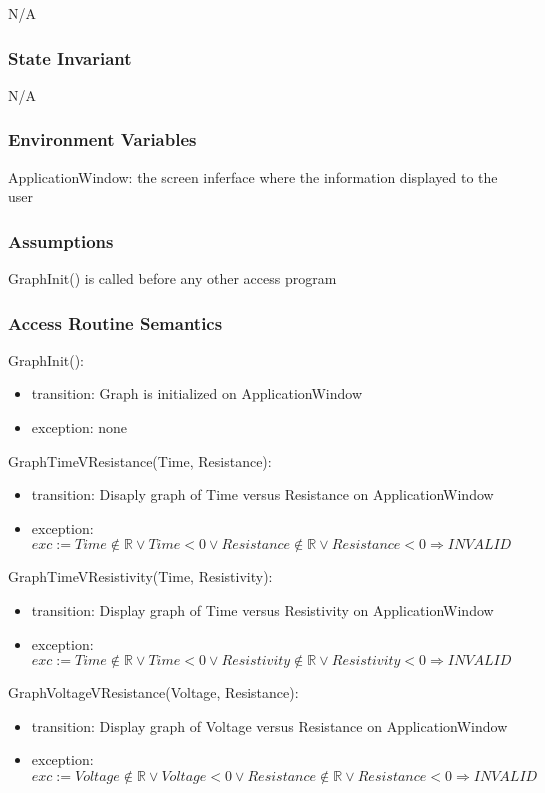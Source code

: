 \documentclass[12pt, titlepage]{article}
\begin{document}
N/A

\subsubsection{State Invariant}

N/A
\subsubsection{Environment Variables}

ApplicationWindow: the screen inferface where the information displayed to the user

\subsubsection{Assumptions}

GraphInit() is called before any other access program

\subsubsection{Access Routine Semantics}

\noindent GraphInit():
\begin{itemize}
\item transition: Graph is initialized on ApplicationWindow
\item exception: none
\end{itemize}

\noindent GraphTimeVResistance(Time, Resistance):
\begin{itemize}
\item transition: Disaply graph of Time versus Resistance on ApplicationWindow 
\item exception: $exc:= Time \notin  \mathbb{R} \lor Time < 0 \lor  Resistance \notin  \mathbb{R} \lor Resistance < 0\Rightarrow INVALID$
\end{itemize}

\noindent GraphTimeVResistivity(Time, Resistivity):
\begin{itemize}
\item transition: Display graph of Time versus Resistivity on ApplicationWindow
\item exception: $exc:= Time \notin  \mathbb{R} \lor Time < 0 \lor  Resistivity \notin  \mathbb{R} \lor Resistivity < 0\Rightarrow INVALID$
\end{itemize}

\noindent GraphVoltageVResistance(Voltage, Resistance):
\begin{itemize}
\item transition: Display graph of Voltage versus Resistance on ApplicationWindow
\item exception: $exc:= Voltage\notin  \mathbb{R} \lor Voltage < 0 \lor  Resistance \notin  \mathbb{R} \lor Resistance < 0\Rightarrow INVALID$
\end{itemize}
\end{document}
